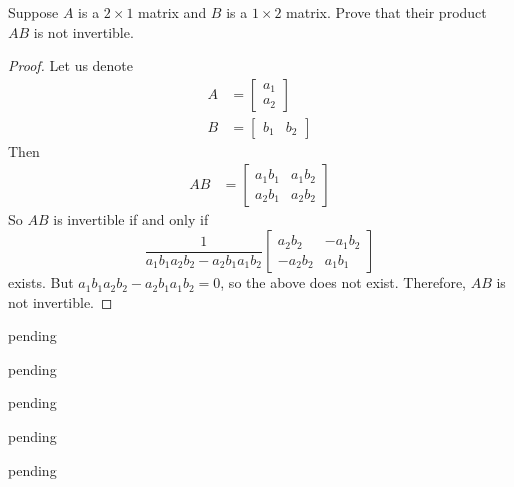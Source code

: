 \begin{exercise} \label{E.1.20}
    Suppose \( A \) is a \( 2 \times 1 \) matrix and \( B \) is a \( 1 \times 2 \) matrix. Prove that their product \( AB \) is not invertible.
    
    \begin{proof}
        Let us denote
        \begin{align*}
            A &= \begin{bmatrix} a_1 \\ a_2 \end{bmatrix} \\
            B &= \begin{bmatrix} b_1 & b_2 \end{bmatrix}
        \end{align*}
        Then
        \begin{align*}
            AB &= \begin{bmatrix} a_1b_1 & a_1b_2 \\ a_2b_1 & a_2b_2 \end{bmatrix}
        \end{align*}
        So \( AB \) is invertible if and only if
        \[ \frac{1}{a_1b_1a_2b_2-a_2b_1a_1b_2}\begin{bmatrix} a_2b_2 & -a_1b_2 \\ -a_2b_2 & a_1b_1 \end{bmatrix} \]
        exists. But \( a_1b_1a_2b_2-a_2b_1a_1b_2 = 0\), so the above does not exist. Therefore, \( AB \) is not invertible. 
    \end{proof}
\end{exercise}

\begin{exercise} \label{E.1.21}
    pending
\end{exercise}

\begin{exercise} \label{E.1.22}
    pending
\end{exercise}

\begin{exercise} \label{E.1.23}
    pending
\end{exercise}

\begin{exercise} \label{E.1.24}
    pending
\end{exercise}

\begin{exercise} \label{E.1.25}
    pending
\end{exercise}

